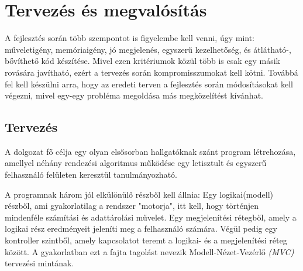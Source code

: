 \documentclass{elteikthesis}
\begin{document}
\section{Tervezés és megvalósítás}
A fejlesztés során több szempontot is figyelembe kell venni, úgy mint: műveletigény, memóriaigény, jó megjelenés, egyszerű kezelhetőség, és átlátható-, bővíthető kód készítése. Mivel ezen kritériumok közül több is csak egy másik rovására javítható, ezért a tervezés során kompromisszumokat kell kötni. Továbbá fel kell készülni arra, hogy az eredeti terven a fejlesztés során módosításokat kell végezni, mivel egy-egy probléma megoldása más megközelítést kívánhat.

\subsection{Tervezés}
A dolgozat fő célja egy olyan elsősorban hallgatóknak szánt program létrehozása, amellyel néhány rendezési algoritmus működése egy letisztult és egyszerű felhasználó felületen keresztül tanulmányozható.\par
A programnak három jól elkülönülő részből kell állnia:
Egy logikai(modell) részből, ami gyakorlatilag a rendszer "motorja", itt kell, hogy történjen mindenféle számítási és adattárolási művelet. Egy megjelenítési rétegből, amely a logikai rész eredményeit jeleníti meg a felhasználó számára. Végül pedig egy kontroller szintből, amely kapcsolatot teremt a logikai- és a megjelenítési réteg között. A gyakorlatban ezt a fajta tagolást nevezik Modell-Nézet-Vezérlő \emph{(MVC)} tervezési mintának.
\end{document}
